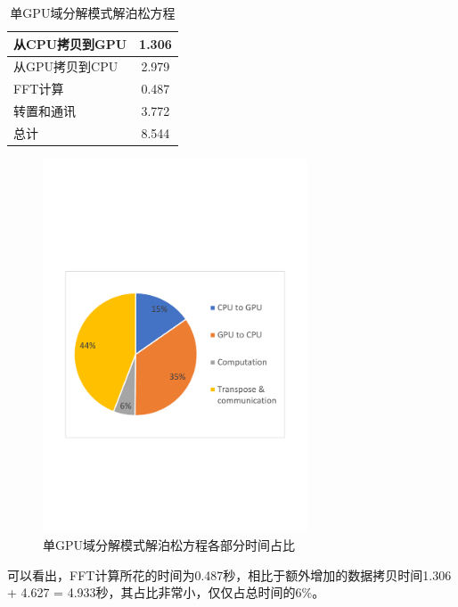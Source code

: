 \begin{table}[!htbp]
    \centering
    \footnotesize%
    \setlength{\tabcolsep}{4pt}%
    \renewcommand{\arraystretch}{1.2}%
    \begin{tabular}{lc}
        \hline\hline
        从CPU拷贝到GPU    & 1.306     \\
        \hline
        从GPU拷贝到CPU    & 2.979     \\
        \hline
        FFT计算                       & 0.487     \\
        \hline
        转置和通讯                  & 3.772     \\
        \hline
        总计                              & 8.544    \\
        \hline\hline
    \end{tabular}
    \caption{单GPU域分解模式解泊松方程}
    \label{tab:1GPU_Poisson}
\end{table}

\begin{figure}[!htb]
    \centering
    \includegraphics[width=0.7\textwidth]{Img/domain_decomposition_1GPU.pdf}
    \caption{单GPU域分解模式解泊松方程各部分时间占比}\label{fig:1GPU_Poisson}
\end{figure}

可以看出，FFT计算所花的时间为0.487秒，相比于额外增加的数据拷贝时间1.306 + 4.627 = 4.933秒，其占比非常小，仅仅占总时间的6\%。

